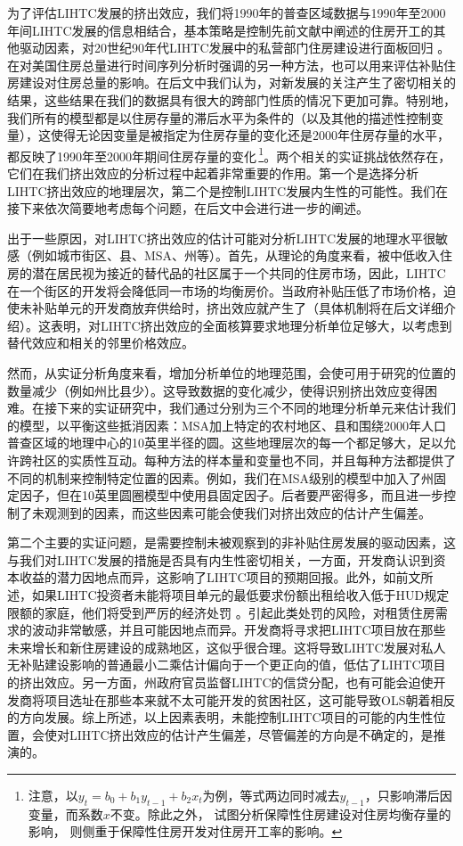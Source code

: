 \documentclass[lang=cn,11pt,a4paper]{paper}
\begin{document}
为了评估LIHTC发展的挤出效应，我们将1990年的普查区域数据与1990年至2000年间LIHTC发展的信息相结合，基本策略是控制先前文献中阐述的住房开工的其他驱动因素，对20世纪90年代LIHTC发展中的私营部门住房建设进行面板回归 \citep{Mayer200085}。\cite{Murray1999107} 在对美国住房总量进行时间序列分析时强调的另一种方法，也可以用来评估补贴住房建设对住房总量的影响。在后文中我们认为，对新发展的关注产生了密切相关的结果，这些结果在我们的数据具有很大的跨部门性质的情况下更加可靠。特别地，我们所有的模型都是以住房存量的滞后水平为条件的（以及其他的描述性控制变量），这使得无论因变量是被指定为住房存量的变化还是2000年住房存量的水平，都反映了1990年至2000年期间住房存量的变化\,\footnote{注意，以$y_t=b_0+b_1y_{t-1}+b_2x_t$为例，等式两边同时减去$y_{t-1}$，只影响滞后因变量，而系数$x$不变。除此之外，\cite{Murray1999107} 试图分析保障性住房建设对住房均衡存量的影响，\cite{Murray1983590} 则侧重于保障性住房开发对住房开工率的影响。}。两个相关的实证挑战依然存在，它们在我们挤出效应的分析过程中起着非常重要的作用。第一个是选择分析LIHTC挤出效应的地理层次，第二个是控制LIHTC发展内生性的可能性。我们在接下来依次简要地考虑每个问题，在后文中会进行进一步的阐述。

出于一些原因，对LIHTC挤出效应的估计可能对分析LIHTC发展的地理水平很敏感（例如城市街区、县、MSA、州等）。首先，从理论的角度来看，被中低收入住房的潜在居民视为接近的替代品的社区属于一个共同的住房市场，因此，LIHTC在一个街区的开发将会降低同一市场的均衡房价。当政府补贴压低了市场价格，迫使未补贴单元的开发商放弃供给时，挤出效应就产生了（具体机制将在后文详细介绍）。这表明，对LIHTC挤出效应的全面核算要求地理分析单位足够大，以考虑到替代效应和相关的邻里价格效应。

然而，从实证分析角度来看，增加分析单位的地理范围，会使可用于研究的位置的数量减少（例如州比县少）。这导致数据的变化减少，使得识别挤出效应变得困难。在接下来的实证研究中，我们通过分别为三个不同的地理分析单元来估计我们的模型，以平衡这些抵消因素：MSA加上特定的农村地区、县和围绕2000年人口普查区域的地理中心的10英里半径的圆。这些地理层次的每一个都足够大，足以允许跨社区的实质性互动。每种方法的样本量和变量也不同，并且每种方法都提供了不同的机制来控制特定位置的因素。例如，我们在MSA级别的模型中加入了州固定因子，但在10英里圆圈模型中使用县固定因子。后者要严密得多，而且进一步控制了未观测到的因素，而这些因素可能会使我们对挤出效应的估计产生偏差。

第二个主要的实证问题，是需要控制未被观察到的非补贴住房发展的驱动因素，这与我们对LIHTC发展的措施是否具有内生性密切相关，一方面，开发商认识到资本收益的潜力因地点而异，这影响了LIHTC项目的预期回报。此外，如前文所述，如果LIHTC投资者未能将项目单元的最低要求份额出租给收入低于HUD规定限额的家庭，他们将受到严厉的经济处罚 \citep{Eriksen2009141}。引起此类处罚的风险，对租赁住房需求的波动非常敏感，并且可能因地点而异。开发商将寻求把LIHTC项目放在那些未来增长和新住房建设的成熟地区，这似乎很合理。这将导致LIHTC发展对私人无补贴建设影响的普通最小二乘估计偏向于一个更正向的值，低估了LIHTC项目的挤出效应。另一方面，州政府官员监督LIHTC的信贷分配，也有可能会迫使开发商将项目选址在那些本来就不太可能开发的贫困社区，这可能导致OLS朝着相反的方向发展。综上所述，以上因素表明，未能控制LIHTC项目的可能的内生性位置，会使对LIHTC挤出效应的估计产生偏差，尽管偏差的方向是不确定的，是推演的。
\end{document}

